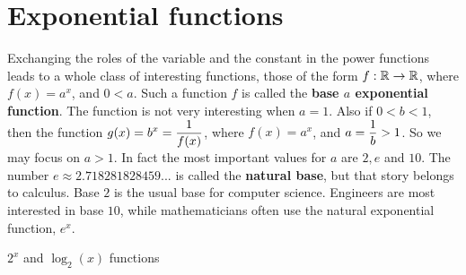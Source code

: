 \section{Exponential functions}
Exchanging the roles of the variable and the constant in the power
functions leads to
a whole class of interesting functions, those of the form $f:\mathbb{R}\to \mathbb{R}$,
 where $f(x)=a^x$,
and $0<a$. Such a  function $f$ is called the {\bfseries base $a$ exponential
 function}. The
function is not very interesting when $a=1$. Also if $0<b<1$, then the function 
$\displaystyle{g(x)=b^x={1\over f(x)}}$, where $f(x)=a^x$, and $\displaystyle{a={1\over b}>1}$.
So we may focus on $a>1$. In fact the most important values for $a$ are $2,e$
 and $10$.
The number $e\approx 2.718281828459...$ is called the {\bfseries natural base}, but
that story belongs to calculus. Base $2$ is the usual base for computer science.
Engineers are most interested in base $10$, while mathematicians often use
the natural exponential function, $e^x$.%
\begin{marginfigure}
 \caption{$2^x$ and $\log_2(x)$ functions}\label{fig:exp_2 log_2 funcs}
\end{marginfigure}%

